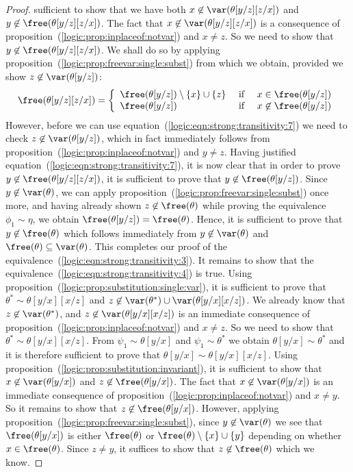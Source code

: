 \begin{proof}
sufficient to show that we have both
$x\not\in\var(\theta[y/z][z/x])$ and
$y\not\in\free(\theta[y/z][z/x])$. The fact that
$x\not\in\var(\theta[y/z][z/x])$ is a consequence of
proposition~(\ref{logic:prop:inplaceof:notvar}) and $x\neq z$. So we
need to show that $y\not\in\free(\theta[y/z][z/x])$. We shall do so
by applying proposition~(\ref{logic:prop:freevar:single:subst}) from
which we obtain, provided we show $z\not\in\var(\theta[y/z])$:
    \begin{equation}\label{logic:eqn:strong:transitivity:7}
    \free(\theta[y/z][z/x])=\left\{\begin{array}{lcl}
    \free(\theta[y/z])\setminus\{x\}\cup\{z\}&\mbox{\ if\ }&x\in\free(\theta[y/z])\\
    \free(\theta[y/z])&\mbox{\ if\ }&x\not\in\free(\theta[y/z])
    \end{array}
    \right.
    \end{equation}
However, before we can use
equation~(\ref{logic:eqn:strong:transitivity:7}) we need to check
$z\not\in\var(\theta[y/z])$, which in fact immediately follows from
proposition~(\ref{logic:prop:inplaceof:notvar}) and $y\neq z$.
Having justified equation~(\ref{logic:eqn:strong:transitivity:7}),
it is now clear that in order to prove
$y\not\in\free(\theta[y/z][z/x])$, it is sufficient to prove that
$y\not\in\free(\theta[y/z])$. Since $y\not\in\var(\theta)$, we can
apply proposition~(\ref{logic:prop:freevar:single:subst}) once more,
and having already shown $z\not\in\free(\theta)$ while proving the
equivalence $\phi_{1}\sim\eta$, we obtain
$\free(\theta[y/z])=\free(\theta)$. Hence, it is sufficient to prove
that $y\not\in\free(\theta)$ which follows immediately from
$y\not\in\var(\theta)$ and $\free(\theta)\subseteq\var(\theta)$.
This completes our proof of the
equivalence~(\ref{logic:eqn:strong:transitivity:3}). It remains to
show that the equivalence~(\ref{logic:eqn:strong:transitivity:4}) is
true. Using proposition~(\ref{logic:prop:substitution:single:var}),
it is sufficient to prove that $\theta^{*}\sim\theta[y/x][x/z]$ and
$z\not\in\var(\theta^{*})\cup\var(\theta[y/x][x/z])$. We already
know that $z\not\in\var(\theta^{*})$, and
$z\not\in\var(\theta[y/x][x/z])$ is an immediate consequence of
proposition~(\ref{logic:prop:inplaceof:notvar}) and $x\neq z$. So we
need to show that $\theta^{*}\sim\theta[y/x][x/z]$. From
$\psi_{1}\sim\theta[y/x]$ and $\psi_{1}\sim\theta^{*}$ we obtain
$\theta[y/x]\sim\theta^{*}$ and it is therefore sufficient to prove
that $\theta[y/x]\sim\theta[y/x][x/z]$. Using
proposition~(\ref{logic:prop:substitution:invariant}), it is
sufficient to show that $x\not\in\var(\theta[y/x])$ and
$z\not\in\free(\theta[y/x])$. The fact that
$x\not\in\var(\theta[y/x])$ is an immediate consequence of
proposition~(\ref{logic:prop:inplaceof:notvar}) and $x\neq y$. So it
remains to show that $z\not\in\free(\theta[y/x])$. However, applying 
proposition~(\ref{logic:prop:freevar:single:subst}), since
$y\not\in\var(\theta)$ we see that $\free(\theta[y/x])$ is either
$\free(\theta)$ or $\free(\theta)\setminus\{x\}\cup\{y\}$ depending
on whether $x\in\free(\theta)$. Since $z\neq y$, it suffices to
show that $z\not\in\free(\theta)$ which we know.
\end{proof}

